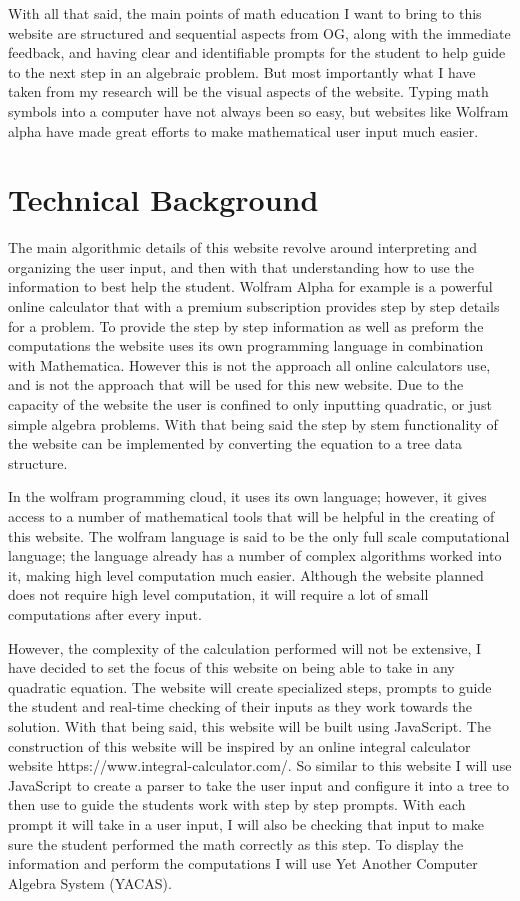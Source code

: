 \documentclass[10pt,twocolumn]{article}
\begin{document}
With all that said, the main points of math education I want to bring to this website are structured and sequential aspects from OG, along with the immediate feedback, and having clear and identifiable prompts for the student to help guide to the next step in an algebraic problem. But most importantly what I have taken from my research will be the visual aspects of the website. Typing math symbols into a computer have not always been so easy, but websites like Wolfram alpha have made great efforts to make mathematical user input much easier. 




\section{Technical Background}
The main algorithmic details of this website revolve around interpreting and organizing the user input, and then with that understanding how to use the information to best help the student. Wolfram Alpha for example is a powerful online calculator that with a premium subscription provides step by step details for a problem. To provide the step by step information as well as preform the computations the website uses its own programming language in combination with Mathematica. However this is not the approach all online calculators use, and is not the approach that will be used for this new website. Due to the capacity of the website the user is confined to only inputting quadratic, or just simple algebra problems. With that being said the step by stem functionality of the website can be implemented by converting the equation to a tree data structure.   

In the wolfram programming cloud, it uses its own language; however, it gives access to a number of mathematical tools that will be helpful in the creating of this website. The wolfram language is said to be the only full scale computational language; the language already has a number of complex algorithms worked into it, making high level computation much easier. Although the website planned does not require high level computation, it will require a lot of small computations after every input. 

However, the complexity of the calculation performed will not be extensive, I have decided to set the focus of this website on being able to take in any quadratic equation. The website will create specialized steps, prompts to guide the student and real-time checking of their inputs as they work towards the solution. With that being said, this website will be built using JavaScript. The construction of this website will be inspired by an online integral calculator website https://www.integral-calculator.com/. So similar to this website I will use JavaScript to create a parser to take the user input and configure it into a tree to then use to guide the students work with step by step prompts. With each prompt it will take in a user input, I will also be checking that input to make sure the student performed the math correctly as this step. To display the information and perform the computations I will use Yet Another Computer Algebra System (YACAS). 
\end{document}
